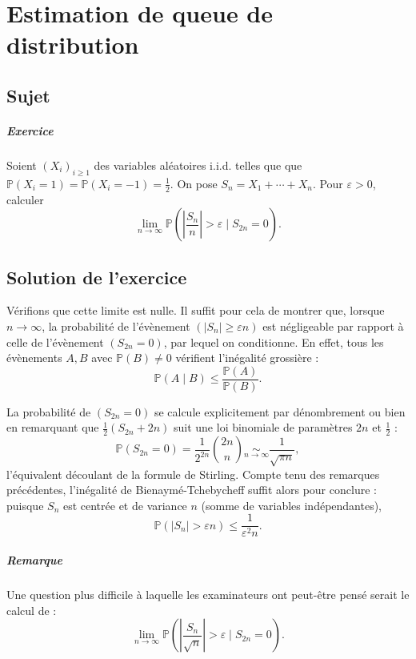 \chapter{Estimation de queue de distribution}

\section{Sujet}

\paragraph{Exercice}
Soient $(X_i)_{i\geqslant 1}$ des variables aléatoires i.i.d. telles que que $\mathbb P(X_i = 1) = \mathbb P(X_i = -1) = \frac12.$
On pose $S_n = X_1 + \cdots + X_n$.
Pour $\varepsilon > 0$, calculer
\[
\lim_{n\to\infty} \mathbb P\left(\left|\frac{S_n}n\right| > \varepsilon \mid S_{2n} = 0\right).
\]

\section{Solution de l'exercice}
Vérifions que cette limite est nulle.
Il suffit pour cela de montrer que, lorsque $n \to \infty$, la probabilité de l'évènement $(|S_n| \geq \varepsilon n)$ est négligeable par rapport à celle de l'évènement $(S_{2n} = 0)$, par lequel on conditionne. En effet, tous les évènements $A,B$ avec $\mathbb P(B) \neq 0$ vérifient l'inégalité grossière :
\[
\mathbb P(A \mid B) \leqslant \frac{\mathbb P(A)}{\mathbb P(B)}.
\]

La probabilité de $(S_{2n} = 0)$ se calcule explicitement par dénombrement ou bien en remarquant que $\frac12(S_{2n}+{2n})$ suit une loi binomiale de paramètres $2n$ et $\frac12$ :
\[
\mathbb P(S_{2n} = 0) = \frac1{2^{2n}}\binom{2n}{n} \underset{n\to\infty}{\sim} \frac 1{\sqrt{\pi n}},
\]
l'équivalent découlant de la formule de Stirling. Compte tenu des remarques précédentes, l'inégalité de Bienaymé-Tchebycheff suffit alors pour conclure : puisque $S_n$ est centrée et de variance $n$ (somme de variables indépendantes),
\[
 \mathbb P\left(|S_n| > \varepsilon n\right) \leqslant \frac{1}{\varepsilon^2 n}.
\]

\paragraph{Remarque}
Une question plus difficile à laquelle les examinateurs ont peut-être pensé serait le calcul de :
\[
\lim_{n\to\infty} \mathbb P\left(\left|\frac{S_n}{\sqrt n}\right| > \varepsilon \mid S_{2n} = 0\right).
\]

